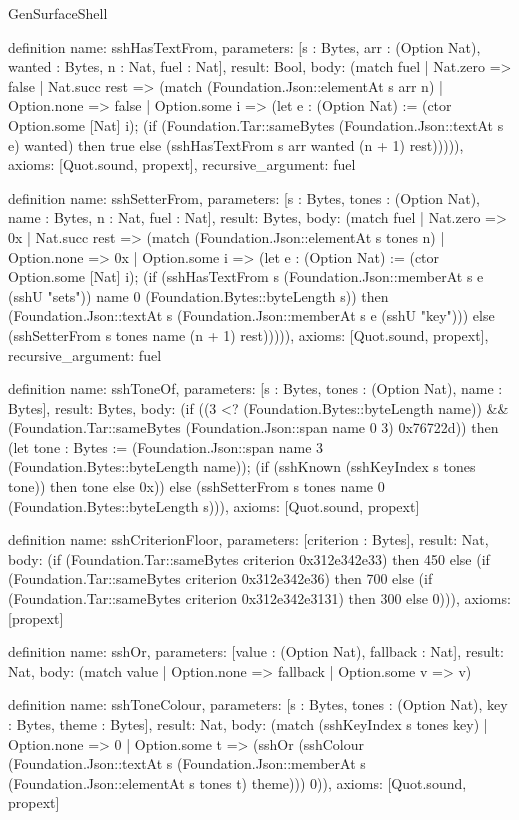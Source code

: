 \begin{lexlean}{GenSurfaceShell}
\begin{semanticmodule}
definition{
  name: sshHasTextFrom,
  parameters: [s : Bytes, arr : (Option Nat), wanted : Bytes, n : Nat, fuel : Nat],
  result: Bool,
  body: (match fuel
    | Nat.zero => false
    | Nat.succ rest => (match (Foundation.Json::elementAt s arr n)
      | Option.none => false
      | Option.some i => (let e : (Option Nat) := (ctor Option.some [Nat] i); (if (Foundation.Tar::sameBytes (Foundation.Json::textAt s e) wanted) then true else (sshHasTextFrom s arr wanted (n + 1) rest))))),
  axioms: [Quot.sound, propext],
  recursive_argument: fuel
}

definition{
  name: sshSetterFrom,
  parameters: [s : Bytes, tones : (Option Nat), name : Bytes, n : Nat, fuel : Nat],
  result: Bytes,
  body: (match fuel
    | Nat.zero => 0x
    | Nat.succ rest => (match (Foundation.Json::elementAt s tones n)
      | Option.none => 0x
      | Option.some i => (let e : (Option Nat) := (ctor Option.some [Nat] i); (if (sshHasTextFrom s (Foundation.Json::memberAt s e (sshU "sets")) name 0 (Foundation.Bytes::byteLength s)) then (Foundation.Json::textAt s (Foundation.Json::memberAt s e (sshU "key"))) else (sshSetterFrom s tones name (n + 1) rest))))),
  axioms: [Quot.sound, propext],
  recursive_argument: fuel
}

definition{
  name: sshToneOf,
  parameters: [s : Bytes, tones : (Option Nat), name : Bytes],
  result: Bytes,
  body: (if ((3 <? (Foundation.Bytes::byteLength name)) && (Foundation.Tar::sameBytes (Foundation.Json::span name 0 3) 0x76722d)) then (let tone : Bytes := (Foundation.Json::span name 3 (Foundation.Bytes::byteLength name)); (if (sshKnown (sshKeyIndex s tones tone)) then tone else 0x)) else (sshSetterFrom s tones name 0 (Foundation.Bytes::byteLength s))),
  axioms: [Quot.sound, propext]
}

definition{
  name: sshCriterionFloor,
  parameters: [criterion : Bytes],
  result: Nat,
  body: (if (Foundation.Tar::sameBytes criterion 0x312e342e33) then 450 else (if (Foundation.Tar::sameBytes criterion 0x312e342e36) then 700 else (if (Foundation.Tar::sameBytes criterion 0x312e342e3131) then 300 else 0))),
  axioms: [propext]
}

definition{
  name: sshOr,
  parameters: [value : (Option Nat), fallback : Nat],
  result: Nat,
  body: (match value | Option.none => fallback | Option.some v => v)
}

definition{
  name: sshToneColour,
  parameters: [s : Bytes, tones : (Option Nat), key : Bytes, theme : Bytes],
  result: Nat,
  body: (match (sshKeyIndex s tones key)
    | Option.none => 0
    | Option.some t => (sshOr (sshColour (Foundation.Json::textAt s (Foundation.Json::memberAt s (Foundation.Json::elementAt s tones t) theme))) 0)),
  axioms: [Quot.sound, propext]
}


\end{semanticmodule}
\end{lexlean}

